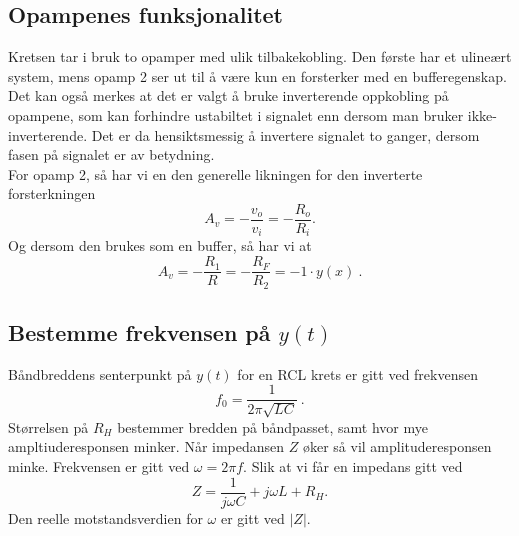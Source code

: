 \documentclass[a4paper,11pt,norsk]{article}
\begin{document}
\subsection{Opampenes funksjonalitet}\label{sec: opamp}
Kretsen tar i bruk to opamper med ulik tilbakekobling.
Den første har et ulineært system, mens opamp 2 ser ut til å være kun en forsterker med en bufferegenskap. 
Det kan også merkes at det er valgt å bruke inverterende oppkobling på opampene, som kan forhindre ustabiltet i signalet enn dersom man bruker ikke-inverterende. Det er da hensiktsmessig å invertere signalet to ganger, dersom fasen på signalet er av betydning. 
\\
For opamp 2, så har vi en den generelle likningen for den inverterte forsterkningen 
\begin{equation}
    A_v = -\frac{v_o}{v_i} = -\frac{R_o}{R_i}.
\end{equation}
Og dersom den brukes som en buffer, så har vi at 
\begin{equation}
    A_v = -\frac{R_1}{R} = -\frac{R_F}{R_2} = -1\cdot y(x) \:.
\end{equation}

\newpage


\newpage
\subsection{Bestemme frekvensen på $y(t)$}
Båndbreddens senterpunkt på $y(t)$ for en RCL krets er gitt ved frekvensen
\begin{equation}\label{eq: f_0}
    f_0 = \frac{1}{2\pi \sqrt{LC}} \:.
\end{equation}
Størrelsen på $R_H$ bestemmer bredden på båndpasset, samt hvor mye ampltiuderesponsen minker. Når impedansen $Z$ øker så vil amplituderesponsen minke. Frekvensen er gitt ved $\omega = 2\pi f$. Slik at vi får en impedans gitt ved
\begin{equation}
    Z = \frac{1}{j\omega C} + j\omega L + R_H.
\end{equation}
Den reelle motstandsverdien for $\omega$ er gitt ved $|Z|$.

\newpage
\end{document}
